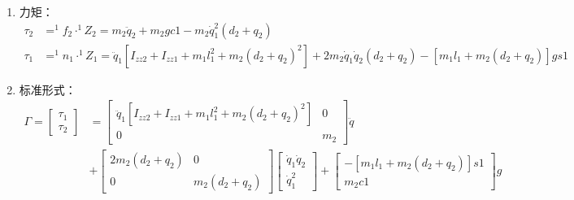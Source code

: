 \documentclass[
12pt, %
a4paper, 
oneside, %
headinclude,footinclude, %
]{scrartcl}
\begin{document}
{\begin{enumerate}
\begin{align*}
\end{align*}
\item 力矩：
\begin{align*}
\tau_2 &= ^1f_2 \cdot ^1Z_2 = m_2\ddot{q}_2 + m_2gc1 - m_2\dot{q}_1^2(d_2 + q_2) \\
\tau_1 &= ^1n_1 \cdot ^1Z_1 = \ddot{q}_1[I_{zz2} + I_{zz1} + m_1l_1^2 + m_2(d_2 + q_2)^2] + 2m_2\dot{q}_1\dot{q}_2(d_2 + q_2) - [m_1l_1 + m_2(d_2 + q_2)]gs1
\end{align*}
\item 标准形式：
\begin{align*}
\Gamma = \begin{bmatrix} \tau_1 \\ \tau_2 \end{bmatrix} 
&= \begin{bmatrix} \ddot{q}_1[I_{zz2} + I_{zz1} + m_1l_1^2 + m_2(d_2 + q_2)^2] & 0 \\ 0 & m_2 \end{bmatrix} \ddot{q} \\
&+ \begin{bmatrix} 2m_2(d_2 + q_2) & 0 \\ 0 & m_2(d_2 + q_2) \end{bmatrix} \begin{bmatrix} \dot{q}_1\dot{q}_2 \\ \dot{q}_1^2 \end{bmatrix} + \begin{bmatrix} - [m_1l_1 + m_2(d_2 + q_2)]s1 \\ m_2c1 \end{bmatrix} g 
\end{align*}
\end{enumerate}
}
\end{document}
